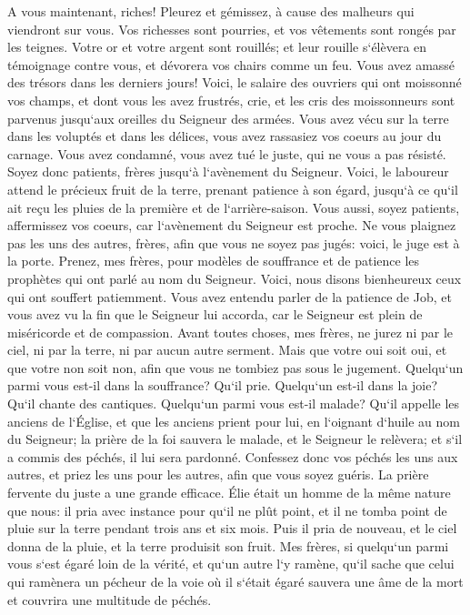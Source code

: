\verse A vous maintenant, riches! Pleurez et gémissez, à cause des malheurs qui viendront sur vous. 
\verse Vos richesses sont pourries, et vos vêtements sont rongés par les teignes. 
\verse Votre or et votre argent sont rouillés; et leur rouille s`élèvera en témoignage contre vous, et dévorera vos chairs comme un feu. Vous avez amassé des trésors dans les derniers jours! 
\verse Voici, le salaire des ouvriers qui ont moissonné vos champs, et dont vous les avez frustrés, crie, et les cris des moissonneurs sont parvenus jusqu`aux oreilles du Seigneur des armées. 
\verse Vous avez vécu sur la terre dans les voluptés et dans les délices, vous avez rassasiez vos coeurs au jour du carnage. 
\verse Vous avez condamné, vous avez tué le juste, qui ne vous a pas résisté. 
\verse Soyez donc patients, frères jusqu`à l`avènement du Seigneur. Voici, le laboureur attend le précieux fruit de la terre, prenant patience à son égard, jusqu`à ce qu`il ait reçu les pluies de la première et de l`arrière-saison. 
\verse Vous aussi, soyez patients, affermissez vos coeurs, car l`avènement du Seigneur est proche. 
\verse Ne vous plaignez pas les uns des autres, frères, afin que vous ne soyez pas jugés: voici, le juge est à la porte. 
\verse Prenez, mes frères, pour modèles de souffrance et de patience les prophètes qui ont parlé au nom du Seigneur. 
\verse Voici, nous disons bienheureux ceux qui ont souffert patiemment. Vous avez entendu parler de la patience de Job, et vous avez vu la fin que le Seigneur lui accorda, car le Seigneur est plein de miséricorde et de compassion. 
\verse Avant toutes choses, mes frères, ne jurez ni par le ciel, ni par la terre, ni par aucun autre serment. Mais que votre oui soit oui, et que votre non soit non, afin que vous ne tombiez pas sous le jugement. 
\verse Quelqu`un parmi vous est-il dans la souffrance? Qu`il prie. Quelqu`un est-il dans la joie? Qu`il chante des cantiques. 
\verse Quelqu`un parmi vous est-il malade? Qu`il appelle les anciens de l`Église, et que les anciens prient pour lui, en l`oignant d`huile au nom du Seigneur; 
\verse la prière de la foi sauvera le malade, et le Seigneur le relèvera; et s`il a commis des péchés, il lui sera pardonné. 
\verse Confessez donc vos péchés les uns aux autres, et priez les uns pour les autres, afin que vous soyez guéris. La prière fervente du juste a une grande efficace. 
\verse Élie était un homme de la même nature que nous: il pria avec instance pour qu`il ne plût point, et il ne tomba point de pluie sur la terre pendant trois ans et six mois. 
\verse Puis il pria de nouveau, et le ciel donna de la pluie, et la terre produisit son fruit. 
\verse Mes frères, si quelqu`un parmi vous s`est égaré loin de la vérité, et qu`un autre l`y ramène, 
\verse qu`il sache que celui qui ramènera un pécheur de la voie où il s`était égaré sauvera une âme de la mort et couvrira une multitude de péchés. 
